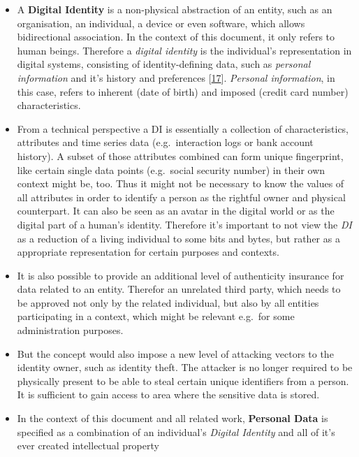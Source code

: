 \documentclass[12pt,english,a4paper,titlepage,cleardoublepage=empty,dottedtoc]{report}
\begin{document}
\begin{itemize}
\item
  A \textbf{Digital Identity} is a non-physical abstraction of an
  entity, such as an organisation, an individual, a device or even
  software, which allows bidirectional association. In the context of
  this document, it only refers to human beings. Therefore a
  \emph{digital identity} is the individual's representation in digital
  systems, consisting of identity-defining data, such as \emph{personal
  information} and it's history and preferences
  {[}\protect\hyperlink{ref-whitepaper_2012_the-value-of-our-digital-identity_definition}{17}{]}.
  \emph{Personal information}, in this case, refers to inherent (date of
  birth) and imposed (credit card number) characteristics.
\item
  From a technical perspective a DI is essentially a collection of
  characteristics, attributes and time series data (e.g.~interaction
  logs or bank account history). A subset of those attributes combined
  can form unique fingerprint, like certain single data points
  (e.g.~social security number) in their own context might be, too. Thus
  it might not be necessary to know the values of all attributes in
  order to identify a person as the rightful owner and physical
  counterpart. It can also be seen as an avatar in the digital world or
  as the digital part of a human's identity. Therefore it's important to
  not view the \emph{DI} as a reduction of a living individual to some
  bits and bytes, but rather as a appropriate representation for certain
  purposes and contexts.
\item
  It is also possible to provide an additional level of authenticity
  insurance for data related to an entity. Therefor an unrelated third
  party, which needs to be approved not only by the related individual,
  but also by all entities participating in a context, which might be
  relevant e.g.~for some administration purposes.
\item
  But the concept would also impose a new level of attacking vectors to
  the identity owner, such as identity theft. The attacker is no longer
  required to be physically present to be able to steal certain unique
  identifiers from a person. It is sufficient to gain access to area
  where the sensitive data is stored.
\item
  In the context of this document and all related work, \textbf{Personal
  Data} is specified as a combination of an individual's \emph{Digital
  Identity} and all of it's ever created intellectual property

\end{itemize}
\end{document}
